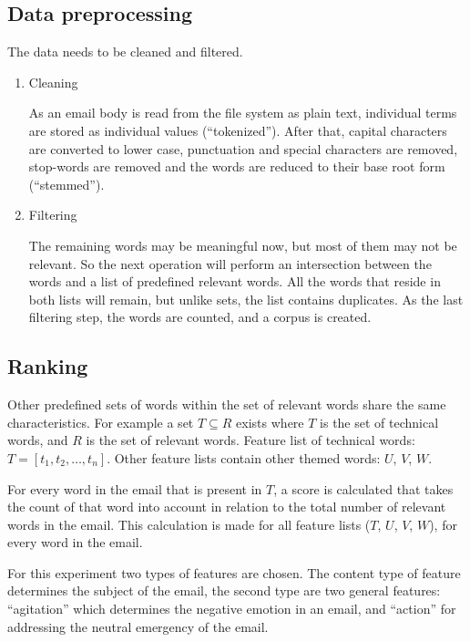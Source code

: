 \documentclass[journal]{IEEEtran}
\begin{document}
\subsection{Data preprocessing}
The data needs to be cleaned and filtered.

\begin{enumerate}
    \item Cleaning

    As an email body is read from the file system as plain text, individual terms are stored as individual values (``tokenized''). After that, capital characters are converted to lower case, punctuation and special characters are removed, stop-words are removed and the words are reduced to their base root form (``stemmed'').

    \item Filtering

    The remaining words may be meaningful now, but most of them may not be
    relevant. So the next operation will perform an intersection between the
    words and a list of predefined relevant words. All the words that reside
    in both lists will remain, but unlike sets, the list contains duplicates.
    As the last filtering step, the words are counted, and a corpus is created.

\end{enumerate}

\subsection{Ranking}

Other predefined sets of words within the set of relevant words share the
    same characteristics. For example a set $T \subseteq R$ exists where $T$
    is the set of technical words, and $R$ is the set of relevant words. Feature list of technical words: $T = [t_1, t_2, \dots, t_n]$.
    Other feature lists contain other themed words: $U$, $V$, $W$.

    For every word in the email that is present in $T$, a score is calculated
    that takes the count of that word into account in relation to the total
    number of relevant words in the email. This calculation is made for all
    feature lists ($T$, $U$, $V$, $W$), for every word in the email.

	For this experiment two types of features are chosen.
	The content type of feature determines the subject of the email, the second type are two general features: ``agitation'' which determines the negative emotion in an email, and ``action'' for addressing the neutral emergency of the email.
\end{document}
